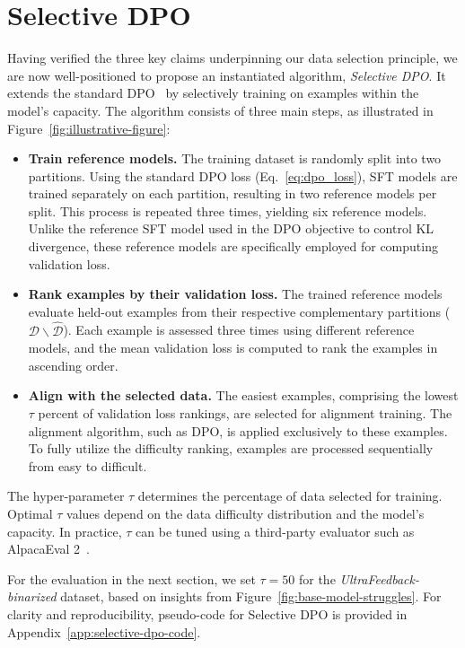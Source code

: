 \section{Selective DPO}
\label{sec:method}

Having verified the three key claims underpinning our data selection principle, we are now well-positioned to propose an instantiated algorithm, \textit{Selective DPO}. It extends the standard DPO~\cite{rafailov2024direct} by selectively training on examples within the model’s capacity. The algorithm consists of three main steps, as illustrated in Figure~\ref{fig:illustrative-figure}:


\begin{itemize}
    \item \textbf{Train reference models.} 
    The training dataset is randomly split into two partitions. Using the standard DPO loss (Eq.~\ref{eq:dpo_loss}), SFT models are trained separately on each partition, resulting in two reference models per split. This process is repeated three times, yielding six reference models. Unlike the reference SFT model used in the DPO objective to control KL divergence, these reference models are specifically employed for computing validation loss.

    \item \textbf{Rank examples by their validation loss.} 
    The trained reference models evaluate held-out examples from their respective complementary partitions ($\mathcal{D} \backslash \hat{\mathcal{D}}$). Each example is assessed three times using different reference models, and the mean validation loss is computed to rank the examples in ascending order. 

    \item \textbf{Align with the selected data.} 
    The easiest examples, comprising the lowest $\tau$ percent of validation loss rankings, are selected for alignment training. The alignment algorithm, such as DPO, is applied exclusively to these examples. To fully utilize the difficulty ranking, examples are processed sequentially from easy to difficult.
\end{itemize}


\begin{remark}
    The hyper-parameter $\tau$ determines the percentage of data selected for training. Optimal $\tau$ values depend on the data difficulty distribution and the model’s capacity. In practice, $\tau$ can be tuned using a third-party evaluator such as AlpacaEval 2~\cite{dubois2024length}. 
\end{remark}

For the evaluation in the next section, we set $\tau=50$ for the \textit{UltraFeedback-binarized} dataset, based on insights from Figure~\ref{fig:base-model-struggles}. For clarity and reproducibility, pseudo-code for Selective DPO is provided in Appendix~\ref{app:selective-dpo-code}.
